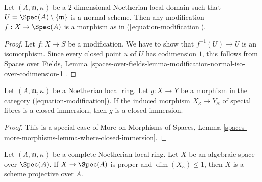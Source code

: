 \begin{lemma}
\label{lemma-modification}
Let $(A, \mathfrak m, \kappa)$ be a $2$-dimensional Noetherian
local domain such that $U = \Spec(A) \setminus \{\mathfrak m\}$
is a normal scheme. Then any modification $f : X \to \Spec(A)$
is a morphism as in (\ref{equation-modification}).
\end{lemma}

\begin{proof}
Let $f : X \to S$ be a modification. We have to show that
$f^{-1}(U) \to U$ is an isomorphism. Since every closed point $u$ of $U$
has codimension $1$, this follows from
Spaces over Fields, Lemma
\ref{spaces-over-fields-lemma-modification-normal-iso-over-codimension-1}.
\end{proof}

\begin{lemma}
\label{lemma-closed-immersion-on-fibre}
Let $(A, \mathfrak m, \kappa)$ be a Noetherian local ring.
Let $g : X \to Y$ be a morphism in the category (\ref{equation-modification}).
If the induced morphism $X_\kappa \to Y_\kappa$ of special fibres is
a closed immersion, then $g$ is a closed immersion.
\end{lemma}

\begin{proof}
This is a special case of
More on Morphisms of Spaces, Lemma
\ref{spaces-more-morphisms-lemma-where-closed-immersion}.
\end{proof}

\begin{lemma}
\label{lemma-projective-over-complete}
Let $(A, \mathfrak m, \kappa)$ be a complete Noetherian local ring.
Let $X$ be an algebraic space over $\Spec(A)$.
If $X \to \Spec(A)$ is proper and $\dim(X_\kappa) \leq 1$, then
$X$ is a scheme projective over $A$.
\end{lemma}


